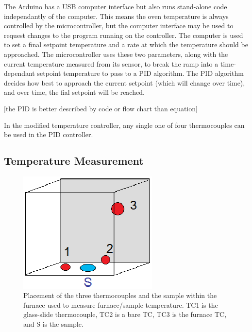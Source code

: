 \documentclass[12pt,oneside,english]{article}
\begin{document}
	The Arduino has a USB computer interface but also runs stand-alone code independantly of the computer.
	This means the oven temperature is always controlled by the microcontroller, but the computer interface may be used to request changes to the program running on the controller.
	The computer is used to set a final setpoint temperature and a rate at which the temperature should be approached.  
	The microcontroller uses these two parameters, along with the current temperature measured from its sensor, to break the ramp into a time-dependant setpoint temperature to pass to a PID algorithm.
	The PID algorithm decides how best to approach the current setpoint (which will change over time), and over time, the fial setpoint will be reached.

	[the PID is better described by code or flow chart than equation]


	In the modified temperature controller, any single one of four thermocouples can be used in the PID controller.	
	
	

	\subsection{Temperature Measurement}
	
	\begin{figure}
		\includegraphics[width=70mm]{images/oven_tc_placement.eps}
		\caption{Placement of the three thermocouples and the sample within the furnace used to measure furnace/sample temperature.  TC1 is the glass-slide thermocouple, TC2 is a bare TC, TC3 is the furnace TC, and S is the sample.}
		\label{f:furnace_tc}
	\end{figure}
	
\end{document}
